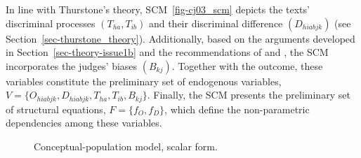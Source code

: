 \documentclass[
  authoryear,
  review,
  1p]{elsarticle}
\begin{document}
In line with Thurstone's theory, SCM~\ref{fig-cj03_scm} depicts the
texts' discriminal processes \((T_{ha}, T_{ib})\) and their discriminal
difference \((D_{hiabjk})\) (see Section~\ref{sec-thurstone_theory}).
Additionally, based on the arguments developed in
Section~\ref{sec-theory-issue1b} and the recommendations of
\citet{Andrich_1978} and \citet{Wainer_et_al_1978}, the SCM incorporates
the judges' biases \((B_{kj})\). Together with the outcome, these
variables constitute the preliminary set of endogenous variables,
\(V = \{ O_{hiabjk}, D_{hiabjk}, T_{ha}, T_{ib}, B_{kj} \}\). Finally,
the SCM presents the preliminary set of structural equations,
\(F = \{ f_{O}, f_{D} \}\), which define the non-parametric dependencies
among these variables.

\begin{figure}[H]

\begin{minipage}{\linewidth}

\centering{

\[
\begin{aligned}
  O^{cp}_{hiabjk} & := f_{O}(D_{hiabjk}) \\
  D_{hiabjk} & := f_{D}(T_{ha}, T_{ib}, B_{jk})
\end{aligned}
\]

}


\end{minipage}%
\newline
\begin{minipage}{\linewidth}



\end{minipage}%

\caption{\label{fig-cj03}Conceptual-population model, scalar form.}

\end{figure}%
\end{document}
